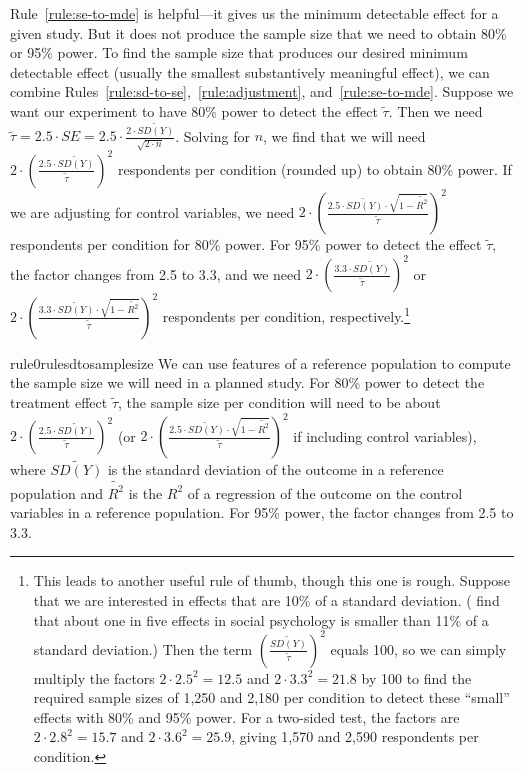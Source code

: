 \documentclass[12pt]{article}
\begin{document}
Rule~\ref{rule:se-to-mde} is helpful---it gives us the minimum detectable effect for a given study.
But it does not produce the sample size that we need to obtain 80\% or 95\% power.
To find the sample size that produces our desired minimum detectable effect (usually the smallest substantively meaningful effect), we can combine Rules~\ref{rule:sd-to-se},~\ref{rule:adjustment}, and~\ref{rule:se-to-mde}.
Suppose we want our experiment to have 80\% power to detect the effect $\widetilde{\tau}$.
Then we need $\widetilde{\tau} = 2.5 \cdot SE = 2.5 \cdot \frac{2 \cdot \widetilde{SD(Y)}}{\sqrt{2 \cdot n}}$.
Solving for $n$, we find that we will need $2 \cdot \left( \frac{2.5 \cdot \widetilde{SD(Y)}}{\widetilde{\tau}} \right)^{2}$ respondents per condition (rounded up) to obtain 80\% power.
If we are adjusting for control variables, we need $2 \cdot \left( \frac{2.5 \cdot \widetilde{SD(Y)} \cdot \sqrt{1 - \widetilde{R^{2}}}}{\widetilde{\tau}} \right)^{2}$ respondents per condition for 80\% power. For 95\% power to detect the effect $\widetilde{\tau}$, the factor changes from 2.5 to 3.3, and we need $2 \cdot \left( \frac{3.3 \cdot \widetilde{SD(Y)}}{\widetilde{\tau}} \right)^{2}$ or $2 \cdot \left( \frac{3.3 \cdot \widetilde{SD(Y)} \cdot \sqrt{1 - \widetilde{R^2}}}{\widetilde{\tau}} \right)^{2}$ respondents per condition, respectively.\footnote{
  This leads to another useful rule of thumb, though this one is rough.
  Suppose that we are interested in effects that are 10\% of a standard deviation.
  (\citet{Lovakov2021} find that about one in five effects in social psychology is smaller than 11\% of a standard deviation.)
  Then the term $\left( \frac{\widetilde{SD(Y)}}{\widetilde{\tau}} \right)^{2}$ equals 100, so we can simply multiply the factors $2 \cdot {2.5}^{2} = 12.5$ and $2 \cdot {3.3}^{2} = 21.8$ by 100 to find the required sample sizes of 1,250 and 2,180 per condition to detect these ``small'' effects with 80\% and 95\% power.
  For a two-sided test, the factors are $2 \cdot {2.8}^{2} = 15.7$ and $2 \cdot {3.6}^{2} = 25.9$, giving 1,570 and 2,590 respondents per condition.
  }

\begin{restatable}{rule0}{rulesdtosamplesize}
\label{rule:sd-to-sample-size}
We can use features of a reference population to compute the sample size we will need in a planned study.
For 80\% power to detect the treatment effect $\widetilde{\tau}$, the sample size per condition will need to be about $2 \cdot \left( \frac{2.5 \cdot \widetilde{SD(Y)}}{\widetilde{\tau}} \right)^{2}$ (or $2 \cdot \left( \frac{2.5 \cdot \widetilde{SD(Y)} \cdot \sqrt{1 - \widetilde{R^{2}}}}{\widetilde{\tau}} \right)^{2}$ if including control variables), where $\widetilde{SD(Y)}$ is the standard deviation of the outcome in a reference population and $\widetilde{R^2}$ is the $R^2$ of a regression of the outcome on the control variables in a reference population.
For 95\% power, the factor changes from 2.5 to 3.3.
\end{restatable}
\end{document}
